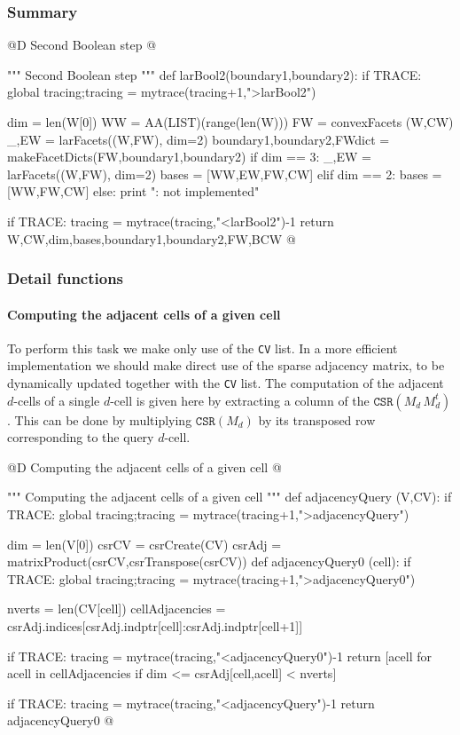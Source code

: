 \documentclass[11pt,oneside]{article}	%
\begin{document}
\subsubsection{Summary}

@D Second Boolean step
@{""" Second Boolean step """
def larBool2(boundary1,boundary2):
	if TRACE: global tracing;tracing = mytrace(tracing+1,">larBool2")

	dim = len(W[0])
	WW = AA(LIST)(range(len(W)))
	FW = convexFacets (W,CW)
	_,EW = larFacets((W,FW), dim=2)
	boundary1,boundary2,FWdict = makeFacetDicts(FW,boundary1,boundary2)
	if dim == 3: 
		_,EW = larFacets((W,FW), dim=2)
		bases = [WW,EW,FW,CW]
	elif dim == 2: bases = [WW,FW,CW]
	else: print "\nerror: not implemented\n"

	if TRACE: tracing = mytrace(tracing,"<larBool2")-1
	return W,CW,dim,bases,boundary1,boundary2,FW,BCW
@}

\subsubsection{Detail functions}


\paragraph{Computing the adjacent cells of a given cell}
To perform this task we make only use of the \texttt{CV} list. In a more efficient implementation we should make direct use of the sparse adjacency matrix, to be dynamically updated together with the \texttt{CV} list.
The computation of the adjacent $d$-cells of a single $d$-cell is given here by extracting a column of the $\texttt{CSR}(M_d\, M_d^t)$. This can be done by multiplying $\texttt{CSR}(M_d)$ by its transposed row corresponding to the query $d$-cell. 

@D Computing the adjacent cells of a given cell
@{""" Computing the adjacent cells of a given cell """
def adjacencyQuery (V,CV):
	if TRACE: global tracing;tracing = mytrace(tracing+1,">adjacencyQuery")

	dim = len(V[0])
	csrCV =  csrCreate(CV)
	csrAdj = matrixProduct(csrCV,csrTranspose(csrCV))
	def adjacencyQuery0 (cell):
		if TRACE: global tracing;tracing = mytrace(tracing+1,">adjacencyQuery0")

		nverts = len(CV[cell])
		cellAdjacencies = csrAdj.indices[csrAdj.indptr[cell]:csrAdj.indptr[cell+1]]

		if TRACE: tracing = mytrace(tracing,"<adjacencyQuery0")-1
		return [acell for acell in cellAdjacencies if dim <= csrAdj[cell,acell] < nverts]

	if TRACE: tracing = mytrace(tracing,"<adjacencyQuery")-1
	return adjacencyQuery0
@}
\end{document}
